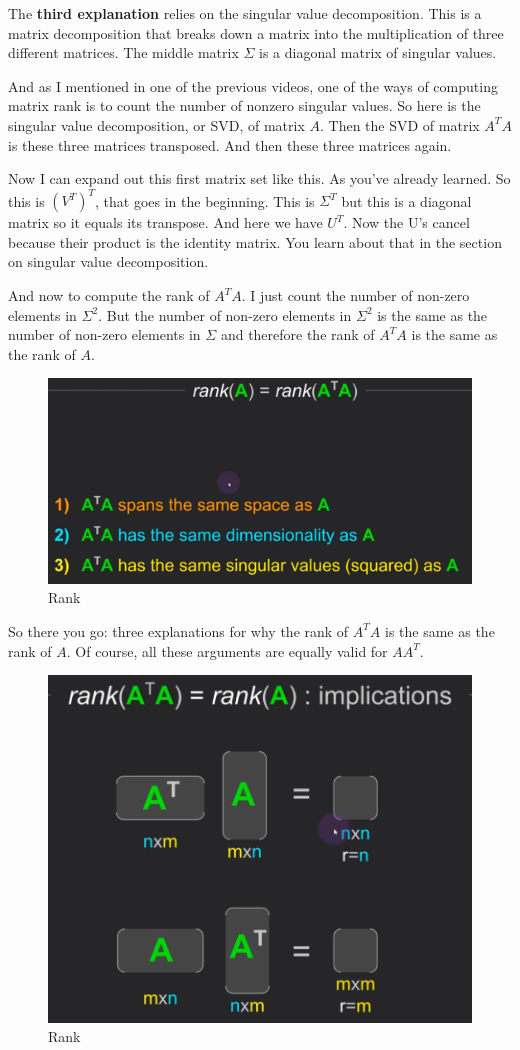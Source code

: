 \documentclass[fleqn,10pt]{olplainarticle}
\theoremstyle{definition}
\theoremstyle{remark}
\begin{document}
The \textbf{third explanation} relies on the singular value decomposition. This is a matrix decomposition that breaks down a matrix into the multiplication of three different matrices. The middle matrix $\Sigma$ is a diagonal matrix of singular values. 

And as I mentioned in one of the previous videos, one of the ways of computing matrix rank is to count the number of nonzero singular values. So here is the singular value decomposition, or SVD, of matrix $A$. Then the SVD of matrix $A^TA$ is these three matrices transposed. And then these three matrices again. 

Now I can expand out this first matrix set like this. As you've already learned. So this is $(V^T)^T$, that goes in the beginning. This is 
$\Sigma^T$ but this is a diagonal matrix so it equals its transpose. And here we have $U^T$. Now the U's cancel because their product is the identity matrix. You learn about that in the section on singular value decomposition.

And now to compute the rank of $A^TA$. I just count the number of non-zero elements in $\Sigma^2$. But the number of non-zero elements in $\Sigma^2$ is the same as the number of non-zero elements in $\Sigma$ and therefore the rank of $A^TA$ is the same as the rank of $A$.

\begin{figure}[ht]
	\centering
	\includegraphics[width=0.5\linewidth]{images/rank-26.png}
	\caption{Rank}
	\label{fig:rank_26}
\end{figure}

So there you go: three explanations for why the rank of $A^TA$ is the same as the rank of $A$. Of course, all these arguments are equally valid for $AA^T$. 

\begin{figure}[ht]
	\centering
	\includegraphics[width=0.5\linewidth]{images/rank-27.png}
	\caption{Rank}
	\label{fig:rank_27}
\end{figure}
\end{document}
